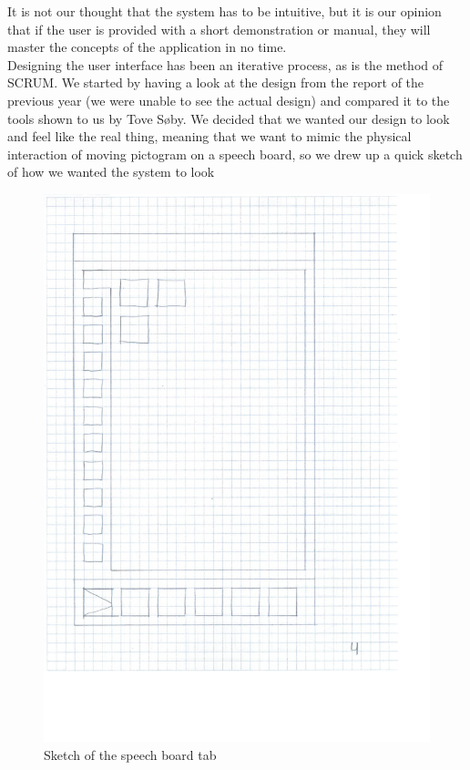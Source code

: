 It is not our thought that the system has to be intuitive, but it is our opinion that if the user is provided with a short demonstration or manual, they will master the concepts of the application in no time.\newline
\\
Designing the user interface has been an iterative process, as is the method of SCRUM. We started by having a look at the design from the report of the previous year (we were unable to see the actual design) and compared it to the tools shown to us by Tove S\o{}by.\newline%
We decided that we wanted our design to look and feel like the real thing, meaning that we want to mimic the physical interaction of moving pictogram on a speech board, so we drew up a quick sketch of how we wanted the system to look\newline
\begin{figure}[htbp]
	\centering
		\includegraphics[scale=0.20]{input/images/speechboard_sketch.PNG}
		\caption{Sketch of the speech board tab}
	\label{fig:speechboard_sketch}
\end{figure}
